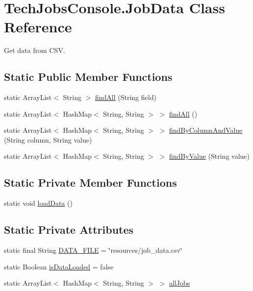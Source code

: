 \hypertarget{class_tech_jobs_console_1_1_job_data}{}\section{Tech\+Jobs\+Console.\+Job\+Data Class Reference}
\label{class_tech_jobs_console_1_1_job_data}


Get data from C\+SV.  


\subsection*{Static Public Member Functions}
\begin{DoxyCompactItemize}
\item 
static Array\+List$<$ String $>$ \mbox{\hyperlink{class_tech_jobs_console_1_1_job_data_ac601200d9c2e103a30eee0b0eef6961a}{find\+All}} (String field)
\item 
static Array\+List$<$ Hash\+Map$<$ String, String $>$ $>$ \mbox{\hyperlink{class_tech_jobs_console_1_1_job_data_a56ed5e82191b2a08930ad13c64c6849c}{find\+All}} ()
\item 
static Array\+List$<$ Hash\+Map$<$ String, String $>$ $>$ \mbox{\hyperlink{class_tech_jobs_console_1_1_job_data_a46bd0cdccbf24af87e20580ed6f1af37}{find\+By\+Column\+And\+Value}} (String column, String value)
\item 
static Array\+List$<$ Hash\+Map$<$ String, String $>$ $>$ \mbox{\hyperlink{class_tech_jobs_console_1_1_job_data_a8d47da2c067369c27e02b4d769cb1739}{find\+By\+Value}} (String value)
\end{DoxyCompactItemize}
\subsection*{Static Private Member Functions}
\begin{DoxyCompactItemize}
\item 
static void \mbox{\hyperlink{class_tech_jobs_console_1_1_job_data_a3b1a57401b0a72276b473d0950e6bb71}{load\+Data}} ()
\end{DoxyCompactItemize}
\subsection*{Static Private Attributes}
\begin{DoxyCompactItemize}
\item 
static final String \mbox{\hyperlink{class_tech_jobs_console_1_1_job_data_a43a1a3c9d4939c8e05d2a8d11f02c0e0}{D\+A\+T\+A\+\_\+\+F\+I\+LE}} = \char`\"{}resources/job\+\_\+data.\+csv\char`\"{}
\item 
static Boolean \mbox{\hyperlink{class_tech_jobs_console_1_1_job_data_a9714fc6381422866943591bf909640f1}{is\+Data\+Loaded}} = false
\item 
static Array\+List$<$ Hash\+Map$<$ String, String $>$ $>$ \mbox{\hyperlink{class_tech_jobs_console_1_1_job_data_afd5ae8f8b5c6d68e614441cd9a9899ae}{all\+Jobs}}
\end{DoxyCompactItemize}


